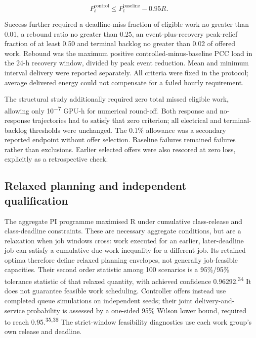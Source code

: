 \documentclass[10pt,a4paper]{article}
\begin{document}
\begin{equation*}
P^{\mathrm{control}}_t \leq P^{\mathrm{baseline}}_t-0.95R.
\end{equation*}

Success further required a deadline-miss fraction of eligible work no greater than 0.01, a rebound ratio no greater than 0.25, an event-plus-recovery peak-relief fraction of at least 0.50 and terminal backlog no greater than 0.02 of offered work. Rebound was the maximum positive controlled-minus-baseline PCC load in the 24-h recovery window, divided by peak event reduction. Mean and minimum interval delivery were reported separately. All criteria were fixed in the protocol; average delivered energy could not compensate for a failed hourly requirement.


The structural study additionally required zero total missed eligible work, allowing only 10\textsuperscript{−7} GPU-h for numerical round-off. Both response and no-response trajectories had to satisfy that zero criterion; all electrical and terminal-backlog thresholds were unchanged. The 0.1\% allowance was a secondary reported endpoint without offer selection. Baseline failures remained failures rather than exclusions. Earlier selected offers were also rescored at zero loss, explicitly as a retrospective check.


\subsection*{Relaxed planning and independent qualification}

The aggregate PI programme maximised R under cumulative class-release and class-deadline constraints. These are necessary aggregate conditions, but are a relaxation when job windows cross: work executed for an earlier, later-deadline job can satisfy a cumulative due-work inequality for a different job. Its retained optima therefore define relaxed planning envelopes, not generally job-feasible capacities. Their second order statistic among 100 scenarios is a 95\%/95\% tolerance statistic of that relaxed quantity, with achieved confidence 0.96292.\textsuperscript{34} It does not guarantee feasible work scheduling. Controller offers instead use completed queue simulations on independent seeds; their joint delivery-and-service probability is assessed by a one-sided 95\% Wilson lower bound, required to reach 0.95.\textsuperscript{35,36} The strict-window feasibility diagnostics use each work group’s own release and deadline.
\end{document}
